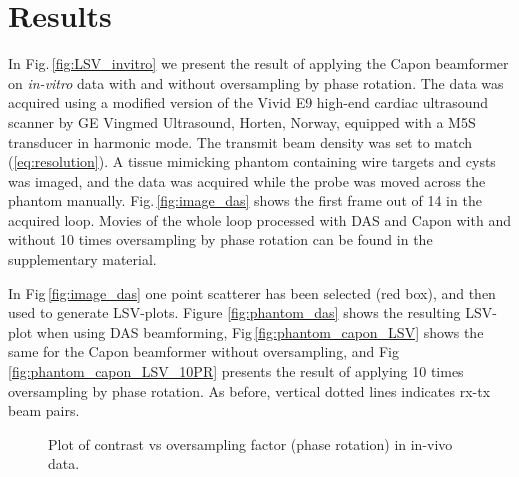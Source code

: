 \documentclass[journal]{IEEEtran}
\begin{document}
\section{Results}\label{sec:res}
In Fig.\,\ref{fig:LSV_invitro} we present the result of applying the Capon beamformer on \textit{in-vitro} data with and without oversampling by phase rotation. The data was acquired using a modified version of the Vivid E9 high-end cardiac ultrasound scanner by GE Vingmed Ultrasound, Horten, Norway, equipped with a M5S transducer in harmonic mode. The transmit beam density was set to match (\ref{eq:resolution}). A tissue mimicking phantom containing wire targets and cysts was imaged, and the data was acquired while the probe was moved across the phantom manually. Fig.\,\ref{fig:image_das} shows the first frame out of 14 in the acquired loop. Movies of the whole loop processed with DAS and Capon with and without 10 times oversampling by phase rotation can be found in the supplementary material.

In Fig\,\ref{fig:image_das} one point scatterer has been selected (red box), and then used to generate LSV-plots. Figure \ref{fig:phantom_das} shows the resulting LSV-plot when using DAS beamforming, Fig\,\ref{fig:phantom_capon_LSV} shows the same for the Capon beamformer without oversampling, and Fig\,\ref{fig:phantom_capon_LSV_10PR} presents the result of applying 10 times oversampling by phase rotation. As before, vertical dotted lines indicates rx-tx beam pairs.


\begin{figure}\caption{Plot of contrast vs oversampling factor (phase rotation) in in-vivo data.}
\end{figure}

\end{document}
